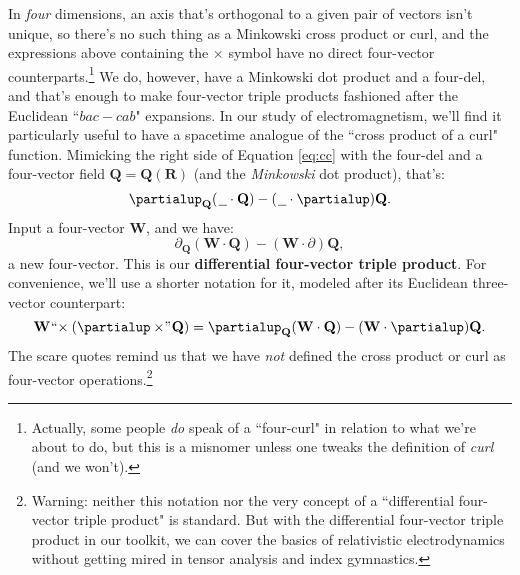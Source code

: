 \documentclass[12pt]{article}
\renewcommand{\vv}[1]{\mathbf{#1}}
\begin{document}
In \emph{four} dimensions, an axis that's orthogonal to a given pair of vectors isn't unique, so there's no such thing as a Minkowski cross product or curl, and the expressions above containing the $\times$ symbol have no direct four-vector counterparts.\footnote{Actually, some people \emph{do} speak of a ``four-curl" in relation to what we're about to do, but this is a misnomer unless one tweaks the definition of \emph{curl} (and we won't).} We do, however, have a Minkowski dot product and a four-del, and that's enough to make four-vector triple products fashioned after the Euclidean ``$bac - cab$" expansions. In our study of electromagnetism, we'll find it particularly useful to have a spacetime analogue of the ``cross product of a curl" function. Mimicking the right side of Equation \ref{eq:cc} with the four-del and a four-vector field $\vv Q = \vv Q (\vv R)$ (and the \emph{Minkowski} dot product), that's:
\begin{equation*}
\partialup_{\vv Q} ( \mkern1.5mu \text{\underline{\hspace{.6em}}} \cdot \vv Q) - ( \mkern1.5mu \text{\underline{\hspace{.6em}}} \cdot \partialup) \vv Q .
\end{equation*}
Input a four-vector $\vv W$, and we have:
\begin{equation*}
\partialup_{\vv Q} ( \vv W \cdot \vv Q) - ( \vv W \cdot \partialup) \vv Q ,
\end{equation*}
a new four-vector. This is our \textbf{differential four-vector triple product}. For convenience, we'll use a shorter notation for it, modeled after its Euclidean three-vector counterpart:
\begin{equation}\label{eq:dtp}
\vv W \mkern1mu `` \mkern-4mu \times (\partialup \times \mkern-4mu " \mkern1mu \vv Q) =  \partialup_{\vv Q} ( \vv W \cdot \vv Q) - ( \vv W \cdot \partialup) \vv Q .
\end{equation}
The scare quotes remind us that we have \emph{not} defined the cross product or curl as four-vector operations.\footnote{Warning: neither this notation nor the very concept of a ``differential four-vector triple product" is standard. But with the differential four-vector triple product in our toolkit, we can cover the basics of relativistic electrodynamics without getting mired in tensor analysis and index gymnastics.}
 
\end{document}
